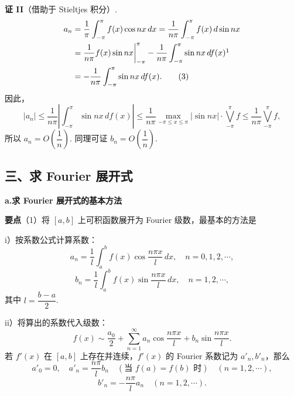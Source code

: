 \documentclass[UTF8,12pt,a4paper,fontset=fandol]{ctexart}
\begin{document}
\noindent\textbf{证 II}\quad （借助于 Stieltjes 积分）.
\[
\begin{aligned}
a_n&=\frac1\pi\int_{-\pi}^{\pi}f(x)\cos nx\,dx
=\frac1{n\pi}\int_{-\pi}^{\pi}f(x)\,d\sin nx\\
&=\frac1{n\pi}f(x)\sin nx\bigg|_{-\pi}^{\pi}
-\frac1{n\pi}\int_{-\pi}^{\pi}\sin nx\,df(x)\footnotemark\\
&=-\frac1{n\pi}\int_{-\pi}^{\pi}\sin nx\,df(x). \qquad(3)
\end{aligned}
\]
因此，
\[
  |a_n|\le\frac1{n\pi}\left|\int_{-\pi}^{\pi}\sin nx\,df(x)\right|
  \le\frac1{n\pi}\max_{-\pi\le x\le\pi}|\sin nx|\cdot\bigvee_{-\pi}^{\pi}f
  \le\frac1{n\pi}\bigvee_{-\pi}^{\pi}f,
\]
所以 $a_n=O\left(\dfrac1n\right)$. 同理可证 $b_n=O\left(\dfrac1n\right)$.


\subsection*{三、求 Fourier 展开式}

\noindent\textbf{a.\quad 求 Fourier 展开式的基本方法}

\noindent\textbf{要点}\quad （1）将 $[a,b]$ 上可积函数展开为 Fourier 级数，最基本的方法是

i）按系数公式计算系数：
\[
  a_n=\frac1l\int_a^b f(x)\cos\frac{n\pi x}{l}\,dx,\quad n=0,1,2,\cdots,
\]
\[
  b_n=\frac1l\int_a^b f(x)\sin\frac{n\pi x}{l}\,dx,\quad n=1,2,\cdots,
\]
其中 $l=\dfrac{b-a}{2}$.

ii）将算出的系数代入级数：
\[
  f(x)\sim\frac{a_0}2+\sum_{n=1}^{\infty}a_n\cos\frac{n\pi x}{l}
  +b_n\sin\frac{n\pi x}{l}.
\]
若 $f'(x)$ 在 $[a,b]$ 上存在并连续，$f'(x)$ 的 Fourier 系数记为 $a'_n,b'_n$，那么
\[
  a'_0=0,\quad a'_n=\frac{n\pi}{l}b_n\quad(\text{当 }f(a)=f(b)\text{ 时})\quad(n=1,2,\cdots),
\]
\[
  b'_n=-\frac{n\pi}{l}a_n\quad(n=1,2,\cdots).
\]
\end{document}
